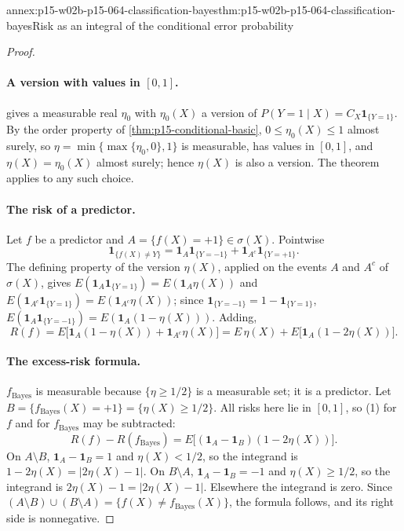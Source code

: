 \begin{annexitem}{annex:p15-w02b-p15-064-classification-bayes}{thm:p15-w02b-p15-064-classification-bayes}{Risk as an integral of the conditional error probability}
\begin{proof}
\paragraph{A version with values in \([0,1]\).}
 gives a measurable real
\(\eta_0\) with \(\eta_0(X)\) a version of
\(P(Y=1\mid X)=C_X\mathbf1_{\{Y=1\}}\). By the order property of
\cref{thm:p15-conditional-basic}, \(0\leq\eta_0(X)\leq1\) almost surely, so
\(\eta=\min\{\max\{\eta_0,0\},1\}\) is measurable, has values in \([0,1]\),
and \(\eta(X)=\eta_0(X)\) almost surely; hence \(\eta(X)\) is also a version.
The theorem applies to any such choice.

\paragraph{The risk of a predictor.}
Let \(f\) be a predictor and \(A=\{f(X)=+1\}\in\sigma(X)\). Pointwise
\[
 \mathbf1_{\{f(X)\neq Y\}}
 =\mathbf1_A\mathbf1_{\{Y=-1\}}+\mathbf1_{A^c}\mathbf1_{\{Y=+1\}} .
\]
The defining property of the version \(\eta(X)\), applied on the events
\(A\) and \(A^c\) of \(\sigma(X)\), gives
\(E(\mathbf1_A\mathbf1_{\{Y=1\}})=E(\mathbf1_A\eta(X))\) and
\(E(\mathbf1_{A^c}\mathbf1_{\{Y=1\}})=E(\mathbf1_{A^c}\eta(X))\); since
\(\mathbf1_{\{Y=-1\}}=1-\mathbf1_{\{Y=1\}}\),
\(E(\mathbf1_A\mathbf1_{\{Y=-1\}})=E(\mathbf1_A(1-\eta(X)))\). Adding,
\[
 R(f)=E\bigl[\mathbf1_A(1-\eta(X))+\mathbf1_{A^c}\eta(X)\bigr]
 =E\,\eta(X)+E\bigl[\mathbf1_A(1-2\eta(X))\bigr].
 \tag{1}
\]

\paragraph{The excess-risk formula.}
\(f_{\mathrm{Bayes}}\) is measurable because \(\{\eta\geq1/2\}\) is a
measurable set; it is a predictor. Let \(B=\{f_{\mathrm{Bayes}}(X)=+1\}=
\{\eta(X)\geq1/2\}\). All risks here lie in \([0,1]\), so (1) for \(f\) and
for \(f_{\mathrm{Bayes}}\) may be subtracted:
\[
 R(f)-R(f_{\mathrm{Bayes}})=E\bigl[(\mathbf1_A-\mathbf1_B)(1-2\eta(X))\bigr].
\]
On \(A\setminus B\), \(\mathbf1_A-\mathbf1_B=1\) and \(\eta(X)<1/2\), so the
integrand is \(1-2\eta(X)=|2\eta(X)-1|\). On \(B\setminus A\),
\(\mathbf1_A-\mathbf1_B=-1\) and \(\eta(X)\geq1/2\), so the integrand is
\(2\eta(X)-1=|2\eta(X)-1|\). Elsewhere the integrand is zero. Since
\((A\setminus B)\cup(B\setminus A)=\{f(X)\neq f_{\mathrm{Bayes}}(X)\}\), the
formula follows, and its right side is nonnegative.


\end{proof}
\end{annexitem}
